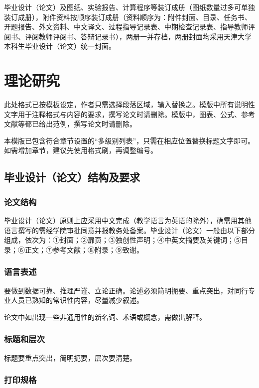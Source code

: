 毕业设计（论文）及图纸、实验报告、计算程序等装订成册（图纸数量过多可单独装订成册），附件资料按顺序装订成册（资料顺序为：附件封面、目录、任务书、开题报告、外文资料、中文译文、过程指导记录表、中期检查记录表、指导教师评阅书、评阅教师评阅书、答辩记录书），两册一并存档，两册封面均采用天津大学本科生毕业设计（论文）统一封面。

\chapter{理论研究}

此处格式已按模板设定，作者只需选择段落区域，输入替换之。模版中所有说明性文字用于注释格式与内容的要求，撰写论文时请删除。模版中，图表、公式、参考文献等都已给出范例，撰写论文时请删除。

本模版已包含符合章节设置的“多级别列表”，只需在相应位置替换标题文字即可。如需增加章节，建议先使用格式刷，再调整编号。

\section{毕业设计（论文）结构及要求}

\subsection{论文结构}

毕业设计（论文）原则上应采用中文完成（教学语言为英语的除外），确需用其他语言撰写的需经学院审批同意并报教务处备案。毕业设计（论文）一般由以下部分组成，依次为：①封面；②扉页；③独创性声明；④中英文摘要及关键词；⑤目录；⑥正文；⑦参考文献；⑧附录；⑨致谢。

\subsection{语言表述}

要做到数据可靠、推理严谨、立论正确。论述必须简明扼要、重点突出，对同行专业人员已熟知的常识性内容，尽量减少叙述。

论文中如出现一些非通用性的新名词、术语或概念，需做出解释。

\subsection{标题和层次}

标题要重点突出，简明扼要，层次要清楚。

\subsection{打印规格}

